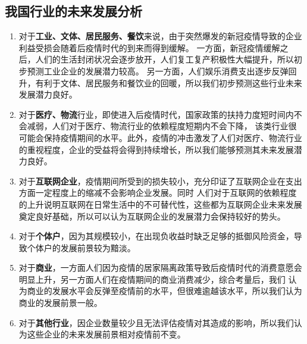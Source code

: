 \documentclass[withoutpreface,bwprint]{cumcmthesis}
\begin{document}
    \subsection{我国行业的未来发展分析}
        \begin{enumerate}
            \item 对于\textbf{工业、文体、居民服务、餐饮}来说，由于突然爆发的新冠疫情导致的企业利益受损会随着后疫情时代的到来而得到缓解。
                  一方面，新冠疫情缓解之后，人们的生活封闭状况会逐步放开，人们复工复产积极性大幅提升，所以初步预测工业企业的发展潜力较高。
                  另一方面，人们娱乐消费支出逐步反弹回升，有利于文体、居民服务和餐饮业的回暖，所以我们初步预测这些行业未来发展潜力良好。
            \item 对于\textbf{医疗、物流}行业，即使进入后疫情时代，国家政策的扶持力度短时间内不会减弱，人们对于医疗、物流行业的依赖程度短期内不会下降，
                  该类行业很可能会保持疫情期间的水平。此外，疫情的冲击激发了人们对医疗、物流行业的重视程度，企业的受益将会得到持续增长，所以我们能够预测其未来发展潜力良好。
            \item 对于\textbf{互联网企业}，疫情期间所受到的损失较小，充分印证了互联网企业在支出方面一定程度上的缩减不会影响企业发展。同时
                  人们对于互联网的依赖程度的上升说明互联网在日常生活中的不可替代性，这些都为互联网企业未来发展奠定良好基础，所以可以认为互联网企业的发展潜力会保持较好的势头。
            \item 对于\textbf{个体户}，因为其规模较小，在出现负收益时缺乏足够的抵御风险资金，导致个体户的发展前景较为黯淡。
            \item 对于\textbf{商业}，一方面人们因为疫情的居家隔离政策导致后疫情时代的消费意愿会明显上升，另一方面人们在疫情期间的商业消费减少，综合考量后，我们
                  认为商业的发展水平会反弹至疫情前的水平，但很难逾越该水平，所以我们认为商业的发展前景一般。
            \item 对于\textbf{其他行业}，因企业数量较少且无法评估疫情对其造成的影响，所以我们认为这些企业的未来发展前景相对疫情前不变。
        \end{enumerate}
\end{document}
